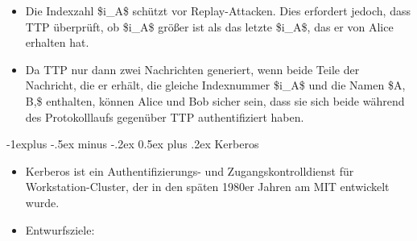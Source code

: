 \documentclass[a4paper]{article}
\makeatletter
\renewcommand{\subsection}{\@startsection{subsection}{2}{0mm}%
 {-1explus -.5ex minus -.2ex}%
 {0.5ex plus .2ex}%
 {\normalfont\normalsize\bfseries}}
\makeatother
\begin{document}
\begin{multicols}{3}
\begin{itemize}
              \begin{itemize}
                  \item
                        Die Indexzahl \$i\_A\$ schützt vor Replay-Attacken. Dies erfordert
                        jedoch, dass TTP überprüft, ob \$i\_A\$ größer ist als das letzte
                        \$i\_A\$, das er von Alice erhalten hat.
                  \item
                        Da TTP nur dann zwei Nachrichten generiert, wenn beide Teile der
                        Nachricht, die er erhält, die gleiche Indexnummer \$i\_A\$ und die
                        Namen \$A, B,\$ enthalten, können Alice und Bob sicher sein, dass
                        sie sich beide während des Protokolllaufs gegenüber TTP
                        authentifiziert haben.
              \end{itemize}
    \end{itemize}


    \subsection{Kerberos}

    \begin{itemize}
        \item
              Kerberos ist ein Authentifizierungs- und Zugangskontrolldienst für
              Workstation-Cluster, der in den späten 1980er Jahren am MIT entwickelt
              wurde.
        \item
              Entwurfsziele:


\end{itemize}
\end{multicols}
\end{document}
